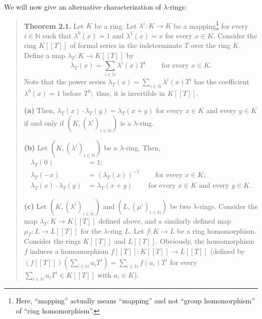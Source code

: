 \documentclass[numbers=enddot,12pt,final,onecolumn,notitlepage]{scrartcl}%
\begin{document}
We will now give an alternative characterization of $\lambda$-rings:

\begin{quote}
\textbf{Theorem 2.1.} Let $K$ be a ring. Let $\lambda^{i}:K\rightarrow K$ be a
mapping\footnote{Here, ``mapping'' actually means ``mapping'' and not ``group
homomorphism'' of ``ring homomorphism''.} for every $i\in\mathbb{N}$ such that
$\lambda^{0}\left(  x\right)  =1$ and $\lambda^{1}\left(  x\right)  =x$ for
every $x\in K$. Consider the ring $K\left[  \left[  T\right]  \right]  $ of
formal series in the indeterminate $T$ over the ring $K.$ Define a map
$\lambda_{T}:K\rightarrow K\left[  \left[  T\right]  \right]  $ by
\[
\lambda_{T}\left(  x\right)  =\sum\limits_{i\in\mathbb{N}}\lambda^{i}\left(
x\right)  T^{i}\ \ \ \ \ \ \ \ \ \ \text{for every }x\in K.
\]
Note that the power series $\lambda_{T}\left(  x\right)  =\sum\limits_{i\in
\mathbb{N}}\lambda^{i}\left(  x\right)  T^{i}$ has the coefficient
$\lambda^{0}\left(  x\right)  =1$ before $T^{0};$ thus, it is invertible in
$K\left[  \left[  T\right]  \right]  $.

\textbf{(a)} Then, $\lambda_{T}\left(  x\right)  \cdot\lambda_{T}\left(
y\right)  =\lambda_{T}\left(  x+y\right)  $ for every $x\in K$ and every $y\in
K$ if and only if $\left(  K,\left(  \lambda^{i}\right)  _{i\in\mathbb{N}%
}\right)  $ is a $\lambda$-ring.

\textbf{(b)} Let $\left(  K,\left(  \lambda^{i}\right)  _{i\in\mathbb{N}%
}\right)  $ be a $\lambda$-ring. Then,%
\begin{align*}
\lambda_{T}\left(  0\right)   &  =1;\\
\lambda_{T}\left(  -x\right)   &  =\left(  \lambda_{T}\left(  x\right)
\right)  ^{-1}\ \ \ \ \ \ \ \ \ \ \text{for every }x\in K;\\
\lambda_{T}\left(  x\right)  \cdot\lambda_{T}\left(  y\right)   &
=\lambda_{T}\left(  x+y\right)  \ \ \ \ \ \ \ \ \ \ \text{for every }x\in
K\text{ and every }y\in K.
\end{align*}


\textbf{(c)} Let $\left(  K,\left(  \lambda^{i}\right)  _{i\in\mathbb{N}%
}\right)  $ and $\left(  L,\left(  \mu^{i}\right)  _{i\in\mathbb{N}}\right)  $
be two $\lambda$-rings. Consider the map $\lambda_{T}:K\rightarrow K\left[
\left[  T\right]  \right]  $ defined above, and a similarly defined map
$\mu_{T}:L\rightarrow L\left[  \left[  T\right]  \right]  $ for the $\lambda
$-ring $L$. Let $f:K\rightarrow L$ be a ring homomorphism. Consider the rings
$K\left[  \left[  T\right]  \right]  $ and $L\left[  \left[  T\right]
\right]  $. Obviously, the homomorphism $f$ induces a homomorphism $f\left[
\left[  T\right]  \right]  :K\left[  \left[  T\right]  \right]  \rightarrow
L\left[  \left[  T\right]  \right]  $ (defined by $\left(  f\left[  \left[
T\right]  \right]  \right)  \left(  \sum\limits_{i\in\mathbb{N}}a_{i}%
T^{i}\right)  =\sum\limits_{i\in\mathbb{N}}f\left(  a_{i}\right)  T^{i}$ for
every $\sum\limits_{i\in\mathbb{N}}a_{i}T^{i}\in K\left[  \left[  T\right]
\right]  $ with $a_{i}\in K$).


\end{quote}
\end{document}
